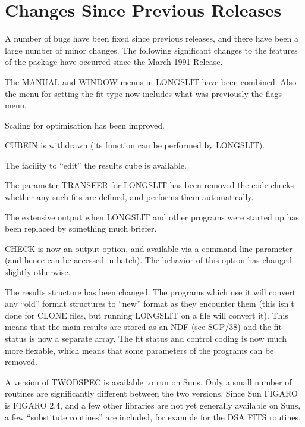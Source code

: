 \appendix

\section{Changes Since Previous Releases}

A number of bugs have been fixed since previous releases, and there have
been a large number of minor changes.
The following significant changes to the features of the package have occurred
since the March 1991 Release.

\begin{list}{()}{}
\item
The MANUAL and WINDOW menus in LONGSLIT have been combined.
Also the menu for setting the fit type now includes what was previously
the flags menu.

\item
Scaling for optimisation has been improved.

\item
CUBEIN is withdrawn (its function can be performed by LONGSLIT).

\item
The facility to ``edit'' the results cube is available.

\item
The parameter TRANSFER for LONGSLIT has been removed-the code checks
whether any such fits are defined, and performs them automatically.

\item
The extensive output when LONGSLIT and other programs were started up
has been replaced by something much briefer.

\item
CHECK is now an output option, and available via a command line
parameter (and hence can be accessed in batch).
The behavior of this option has changed slightly otherwise.

\item
The results structure has been changed.
The programs which use it will convert any ``old'' format structures to
``new'' format as they encounter them (this isn't done for CLONE files,
but running LONGSLIT on a file will convert it).
This means that the main results are stored as an NDF (see SGP/38) and
the fit status is now a separate array.
The fit status and control coding is now much more flexable, which means
that some parameters of the programs can be removed.

\item
A version of TWODSPEC is available to run on Suns.
Only a small number of routines are significantly different between the
two versions.
Since Sun FIGARO is FIGARO 2.4, and a few other libraries are not yet
generally available on Suns, a few ``substitute routines'' are included,
for example for the DSA FITS routines.


\end{list}
